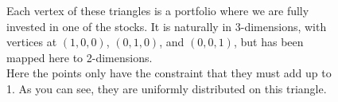 \documentclass{article}\usepackage{graphicx, color}
\begin{document}
\begin{figure}[h]
\centering

\caption{Each vertex of these triangles is a portfolio where we are fully invested in one of the stocks. It is naturally in 3-dimensions, with vertices at $(1,0,0)$, $(0,1,0)$, and $(0,0,1)$, but has been mapped here to 2-dimensions.\\ \protect{} Here the points only have the constraint that they must add up to 1. As you can see, they are uniformly distributed on this triangle.
}
\end{figure}
\end{document}

